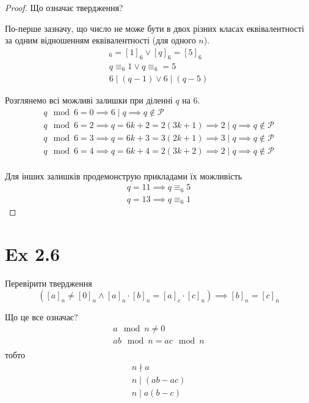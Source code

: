 \documentclass[11pt, a4paper]{article} %
\begin{document}
\begin{proof}
    Що означає твердження?

    По-перше зазначу, що число не може бути в двох різних класах еквівалентності за одним відношенням еквівалентності (для одного $n$).
    \begin{gather*}
    [q]_6 = [1]_6 \vee [q]_6 = [5]_6\\
    q \equiv_6 1 \vee q \equiv_6 = 5\\
    6 \mid (q-1) \vee 6 \mid (q-5)
    \end{gather*}

    Розглянемо всі можливі залишки при діленні $q$ на 6.
    \begin{gather*}
        q \mod 6 = 0 \implies 6 \mid q \implies q \notin \mathcal{P}\\ 
        q \mod 6 = 2 \implies q = 6k+2 = 2(3k+1) \implies 2 \mid q \implies q \notin \mathcal{P}\\
        q \mod 6 = 3 \implies q = 6k+3 = 3(2k+1) \implies 3 \mid q \implies q \notin \mathcal{P}\\
        q \mod 6 = 4 \implies q = 6k+4 = 2(3k+2) \implies 2 \mid q \implies q \notin \mathcal{P}\\
    \end{gather*}

    Для інших залишків продемонструю прикладами їх можливість
    \begin{gather*}
        q = 11 \implies q \equiv_6 5\\
        q = 13 \implies q \equiv_6 1
    \end{gather*}
\end{proof}

\section*{Ex 2.6}
\begin{mdframed}
    Перевірити твердження
    \[\left([a]_n \ne [0]_n \land [a]_n \cdot [b]_n=[a]_c \cdot [c]_n\right) \implies [b]_n = [c]_n\]
\end{mdframed}

Що це все означає?
\begin{gather*}
    a \mod n \ne 0\\
    ab \mod n = ac \mod n\\
\end{gather*}
тобто
\begin{gather*}
    n \nmid a\\
    n \mid (ab-ac)\\
    n \mid a(b-c)
\end{gather*}
\end{document}

